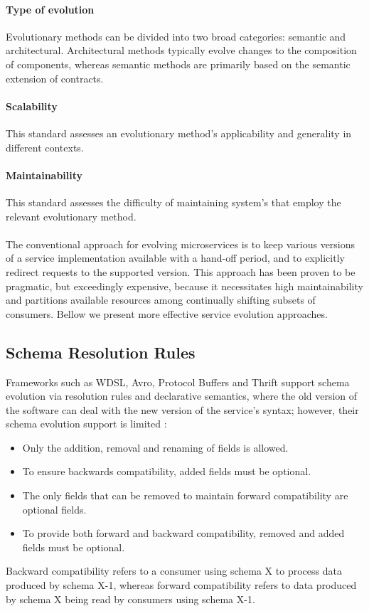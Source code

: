 \paragraph{Type of evolution}
Evolutionary methods can be divided into two broad categories: semantic and architectural.
Architectural methods typically evolve changes to the composition of components, whereas semantic methods are primarily based on the semantic extension of contracts.

\paragraph{Scalability}
This standard assesses an evolutionary method's applicability and generality in different contexts.

\paragraph{Maintainability}
This standard assesses the difficulty of maintaining system's that employ the relevant evolutionary method.

\paragraph{}

The conventional approach for evolving microservices is to keep various versions of a service implementation available with a hand-off period,
and to explicitly redirect requests to the supported version.
This approach has been proven to be pragmatic, but exceedingly expensive,
because it necessitates high maintainability and partitions available resources among continually shifting subsets of consumers.
Bellow we present more effective service evolution approaches.

\subsection{Schema Resolution Rules} %
\label{sec:schema_resolution_rules}

Frameworks such as WDSL, Avro, Protocol Buffers and Thrift support schema evolution via resolution rules and declarative semantics,
where the old version of the software can deal with the new version of the service’s syntax; however, their schema evolution support is limited \cite{11}:
\begin{itemize}
    \item Only the addition, removal and renaming of fields is allowed.
    \item To ensure backwards compatibility, added fields must be optional.
    \item The only fields that can be removed to maintain forward compatibility are optional fields.
    \item To provide both forward and backward compatibility, removed and added fields must be optional.
\end{itemize}
Backward compatibility refers to a consumer using schema X to process data produced by schema X-1,
whereas forward compatibility refers to data produced by schema X being read by consumers using schema X-1.


